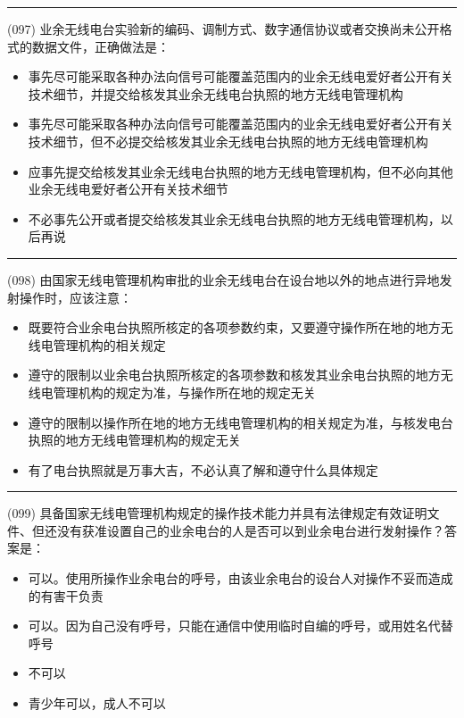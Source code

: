 \documentclass[twocolumn]{ctexart}  %
\begin{document}
\noindent\rule{0.5\textwidth}{1pt}
\heiti (097) 业余无线电台实验新的编码、调制方式、数字通信协议或者交换尚未公开格式的数据文件，正确做法是： \songti {\color{gray} [LK0061] }
\begin{itemize}
	\item  事先尽可能采取各种办法向信号可能覆盖范围内的业余无线电爱好者公开有关技术细节，并提交给核发其业余无线电台执照的地方无线电管理机构
	\item  事先尽可能采取各种办法向信号可能覆盖范围内的业余无线电爱好者公开有关技术细节，但不必提交给核发其业余无线电台执照的地方无线电管理机构
	\item  应事先提交给核发其业余无线电台执照的地方无线电管理机构，但不必向其他业余无线电爱好者公开有关技术细节
	\item  不必事先公开或者提交给核发其业余无线电台执照的地方无线电管理机构，以后再说
\end{itemize}


\noindent\rule{0.5\textwidth}{1pt}
\heiti (098) 由国家无线电管理机构审批的业余无线电台在设台地以外的地点进行异地发射操作时，应该注意： \songti {\color{gray} [LK0062] }
\begin{itemize}
	\item  既要符合业余电台执照所核定的各项参数约束，又要遵守操作所在地的地方无线电管理机构的相关规定
	\item  遵守的限制以业余电台执照所核定的各项参数和核发其业余电台执照的地方无线电管理机构的规定为准，与操作所在地的规定无关
	\item  遵守的限制以操作所在地的地方无线电管理机构的相关规定为准，与核发电台执照的地方无线电管理机构的规定无关
	\item  有了电台执照就是万事大吉，不必认真了解和遵守什么具体规定
\end{itemize}


\noindent\rule{0.5\textwidth}{1pt}
\heiti (099) 具备国家无线电管理机构规定的操作技术能力并具有法律规定有效证明文件、但还没有获准设置自己的业余电台的人是否可以到业余电台进行发射操作？答案是： \songti {\color{gray} [LK0063] }
\begin{itemize}
	\item  可以。使用所操作业余电台的呼号，由该业余电台的设台人对操作不妥而造成的有害干负责
	\item  可以。因为自己没有呼号，只能在通信中使用临时自编的呼号，或用姓名代替呼号
	\item  不可以
	\item  青少年可以，成人不可以
\end{itemize}
\end{document}

